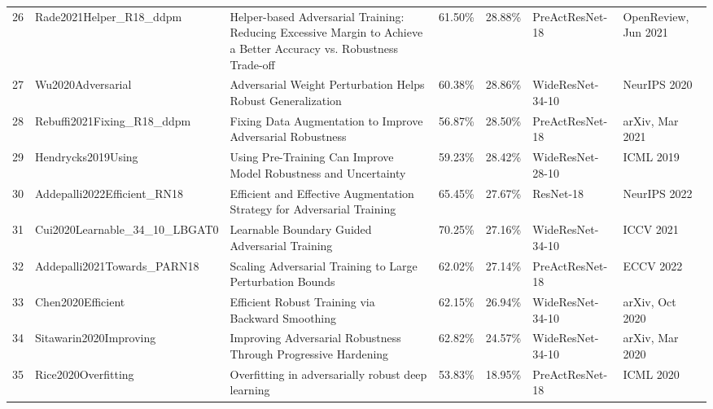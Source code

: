 \begin{table}[]
\begin{tabular}{lllllll}
  26 & Rade2021Helper\_R18\_ddpm                     & Helper-based Adversarial Training: Reducing Excessive Margin to Achieve a Better Accuracy vs. Robustness Trade-off & 61.50\%        & 28.88\%         & PreActResNet-18                                & OpenReview, Jun 2021 \\
  27 & Wu2020Adversarial                             & Adversarial Weight Perturbation Helps Robust Generalization                                                        & 60.38\%        & 28.86\%         & WideResNet-34-10                               & NeurIPS 2020         \\
  28 & Rebuffi2021Fixing\_R18\_ddpm                  & Fixing Data Augmentation to Improve Adversarial Robustness                                                         & 56.87\%        & 28.50\%         & PreActResNet-18                                & arXiv, Mar 2021      \\
  29 & Hendrycks2019Using                            & Using Pre-Training Can Improve Model Robustness and Uncertainty                                                    & 59.23\%        & 28.42\%         & WideResNet-28-10                               & ICML 2019            \\
  30 & Addepalli2022Efficient\_RN18                  & Efficient and Effective Augmentation Strategy for Adversarial Training                                             & 65.45\%        & 27.67\%         & ResNet-18                                      & NeurIPS 2022         \\
  31 & Cui2020Learnable\_34\_10\_LBGAT0              & Learnable Boundary Guided Adversarial Training                                                                     & 70.25\%        & 27.16\%         & WideResNet-34-10                               & ICCV 2021            \\
  32 & Addepalli2021Towards\_PARN18                  & Scaling Adversarial Training to Large Perturbation Bounds                                                          & 62.02\%        & 27.14\%         & PreActResNet-18                                & ECCV 2022            \\
  33 & Chen2020Efficient                             & Efficient Robust Training via Backward Smoothing                                                                   & 62.15\%        & 26.94\%         & WideResNet-34-10                               & arXiv, Oct 2020      \\
  34 & Sitawarin2020Improving                        & Improving Adversarial Robustness Through Progressive Hardening                                                     & 62.82\%        & 24.57\%         & WideResNet-34-10                               & arXiv, Mar 2020      \\
  35 & Rice2020Overfitting                           & Overfitting in adversarially robust deep learning                                                                  & 53.83\%        & 18.95\%         & PreActResNet-18                                & ICML 2020           
  \end{tabular}
  \end{table}